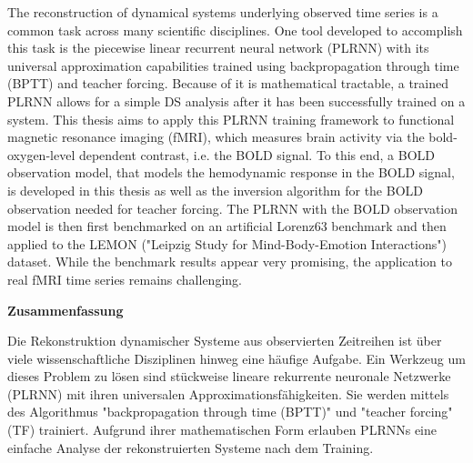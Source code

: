 \documentclass[a4paper, 11pt, oneside]{Thesis}  %
\begin{document}








\pagestyle{fancy}  %

\begin{Abstract}
    The reconstruction of dynamical systems underlying observed time series is a common task across many scientific disciplines. One tool developed 
    to accomplish this task is the piecewise linear recurrent neural network (PLRNN) with its universal approximation capabilities trained using 
    backpropagation through time (BPTT) and teacher forcing. Because of it is mathematical tractable, a trained PLRNN allows for a simple DS analysis 
    after it has been successfully trained on a system. \newline
    This thesis aims to apply this PLRNN training framework to functional magnetic resonance imaging (fMRI), which measures brain activity via the 
    bold-oxygen-level dependent contrast, i.e. the BOLD signal. To this end, a BOLD observation model, that models the hemodynamic response in the 
    BOLD signal, is developed in this thesis as well as the inversion algorithm for the BOLD observation needed for teacher forcing. The PLRNN with the
    BOLD observation model is then first benchmarked on an artificial Lorenz63 benchmark and then applied to the LEMON 
    ("Leipzig Study for Mind-Body-Emotion Interactions") dataset. While the benchmark results appear very promising, the application to real fMRI
    time series remains challenging.
\end{Abstract}

\begin{center}%
  \bfseries{Zusammenfassung} 
\end{center}
  Die Rekonstruktion dynamischer Systeme aus observierten Zeitreihen ist über viele wissenschaftliche Disziplinen hinweg eine häufige Aufgabe.
  Ein Werkzeug um dieses Problem zu lösen sind stückweise lineare rekurrente neuronale Netzwerke (PLRNN) mit ihren universalen Approximationsfähigkeiten.
  Sie werden mittels des Algorithmus "backpropagation through time (BPTT)" und "teacher forcing" (TF) trainiert. Aufgrund ihrer mathematischen Form 
  erlauben PLRNNs eine einfache Analyse der rekonstruierten Systeme nach dem Training. \newline
\end{document}
